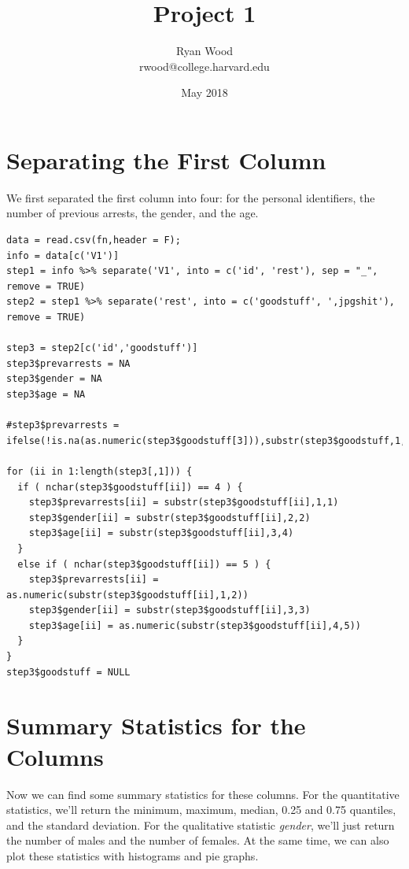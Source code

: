 \documentclass{article}
\title{Project 1}
\author{Ryan Wood\\
rwood@college.harvard.edu}
\date{May 2018}
\begin{document}
\maketitle

\section{Separating the First Column}
We first separated the first column into four: for the personal identifiers, the number of previous arrests, the gender, and the age.\\

\begin{verbatim}
data = read.csv(fn,header = F);
info = data[c('V1')]
step1 = info %>% separate('V1', into = c('id', 'rest'), sep = "_", remove = TRUE)
step2 = step1 %>% separate('rest', into = c('goodstuff', ',jpgshit'), remove = TRUE)

step3 = step2[c('id','goodstuff')]
step3$prevarrests = NA
step3$gender = NA
step3$age = NA

#step3$prevarrests = ifelse(!is.na(as.numeric(step3$goodstuff[3])),substr(step3$goodstuff,1,1,),substr(step3$goodstuff,1,1))

for (ii in 1:length(step3[,1])) {
  if ( nchar(step3$goodstuff[ii]) == 4 ) {
    step3$prevarrests[ii] = substr(step3$goodstuff[ii],1,1)
    step3$gender[ii] = substr(step3$goodstuff[ii],2,2)
    step3$age[ii] = substr(step3$goodstuff[ii],3,4)
  }
  else if ( nchar(step3$goodstuff[ii]) == 5 ) {
    step3$prevarrests[ii] = as.numeric(substr(step3$goodstuff[ii],1,2))
    step3$gender[ii] = substr(step3$goodstuff[ii],3,3)
    step3$age[ii] = as.numeric(substr(step3$goodstuff[ii],4,5))
  }
}
step3$goodstuff = NULL
\end{verbatim}

\section{Summary Statistics for the Columns}

Now we can find some summary statistics for these columns. For the quantitative statistics, we'll return the minimum, maximum, median, 0.25 and 0.75 quantiles, and the standard deviation. For the qualitative statistic \textit{gender}, we'll just return the number of males and the number of females. At the same time, we can also plot these statistics with histograms and pie graphs.\\
\end{document}
